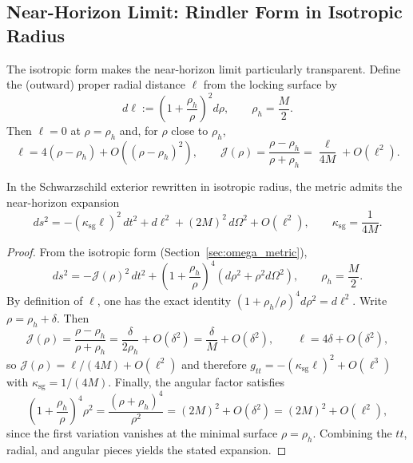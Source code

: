 \subsection{Near-Horizon Limit: Rindler Form in Isotropic Radius}
The isotropic form makes the near-horizon limit particularly transparent. Define the (outward) proper radial distance $\ell$ from the locking surface by
\begin{equation}
  d\ell := \left(1+\frac{\rho_h}{\rho}\right)^2 d\rho,
  \qquad \rho_h=\frac{M}{2}.
\end{equation}
Then $\ell=0$ at $\rho=\rho_h$ and, for $\rho$ close to $\rho_h$,
\begin{equation}
  \ell = 4(\rho-\rho_h)+O\!\left((\rho-\rho_h)^2\right),
  \qquad
  \mathcal{J}(\rho)=\frac{\rho-\rho_h}{\rho+\rho_h}=\frac{\ell}{4M}+O(\ell^2).
\end{equation}

\begin{proposition}
In the Schwarzschild exterior rewritten in isotropic radius, the metric admits the near-horizon expansion
\begin{equation}
  ds^2
  =-(\kappa_{\mathrm{sg}}\ell)^2\,dt^2+d\ell^2+(2M)^2\,d\Omega^2+O(\ell^2),
  \qquad
  \kappa_{\mathrm{sg}}=\frac{1}{4M}.
\end{equation}
\end{proposition}
\begin{proof}
From the isotropic form (Section~\ref{sec:omega_metric}),
\begin{equation}
  ds^2
  =-\mathcal{J}(\rho)^2\,dt^2
  +\left(1+\frac{\rho_h}{\rho}\right)^4\left(d\rho^2+\rho^2 d\Omega^2\right),
  \qquad \rho_h=\frac{M}{2}.
\end{equation}
By definition of $\ell$, one has the exact identity $\left(1+\rho_h/\rho\right)^4 d\rho^2=d\ell^2$.
Write $\rho=\rho_h+\delta$. Then
\begin{equation}
  \mathcal{J}(\rho)=\frac{\rho-\rho_h}{\rho+\rho_h}
  =\frac{\delta}{2\rho_h}+O(\delta^2)=\frac{\delta}{M}+O(\delta^2),
  \qquad
  \ell=4\delta+O(\delta^2),
\end{equation}
so $\mathcal{J}(\rho)=\ell/(4M)+O(\ell^2)$ and therefore $g_{tt}=-(\kappa_{\mathrm{sg}}\ell)^2+O(\ell^3)$ with $\kappa_{\mathrm{sg}}=1/(4M)$.
Finally, the angular factor satisfies
\begin{equation}
  \left(1+\frac{\rho_h}{\rho}\right)^4\rho^2
  =\frac{(\rho+\rho_h)^4}{\rho^2}
  =(2M)^2+O(\delta^2)
  =(2M)^2+O(\ell^2),
\end{equation}
since the first variation vanishes at the minimal surface $\rho=\rho_h$.
Combining the $tt$, radial, and angular pieces yields the stated expansion.
\end{proof}

